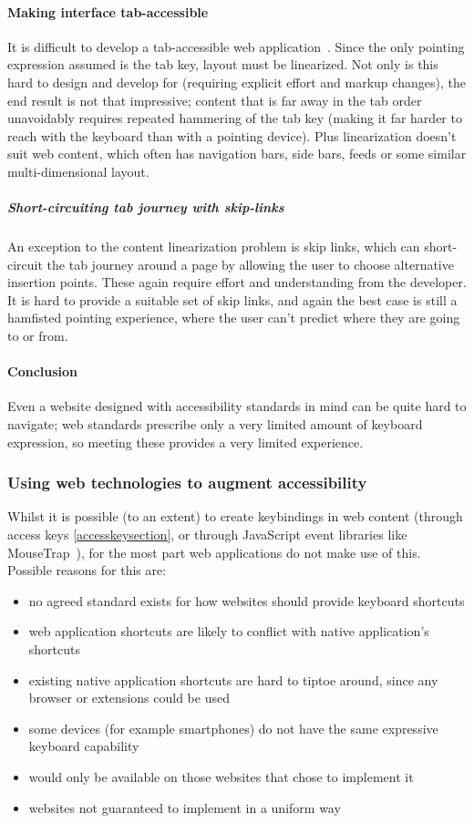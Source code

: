 \documentclass[a4paper, 11pt]{article}
\begin{document}
\paragraph{Making interface tab-accessible}
   It is difficult to develop a tab-accessible web application~\cite{watanabe2012using}. Since the only pointing expression assumed is the tab key, layout must be linearized. Not only is this hard to design and develop for (requiring explicit effort and markup changes), the end result is not that impressive; content that is far away in the tab order unavoidably requires repeated hammering of the tab key (making it far harder to reach with the keyboard than with a pointing device). Plus linearization doesn't suit web content, which often has navigation bars, side bars, feeds or some similar multi-dimensional layout.
\subparagraph{Short-circuiting tab journey with skip-links}
  An exception to the content linearization problem is skip links, which can short-circuit the tab journey around a page by allowing the user to choose alternative insertion points. These again require effort and understanding from the developer. It is hard to provide a suitable set of skip links, and again the best case is still a hamfisted pointing experience, where the user can't predict where they are going to or from.
\paragraph{Conclusion}
  Even a website designed with accessibility standards in mind can be quite hard to navigate; web standards prescribe only a very limited amount of keyboard expression, so meeting these provides a very limited experience.

\subsubsection{Using web technologies to augment accessibility}
  Whilst it is possible (to an extent) to create \glspl{keybinding} in web content (through access keys \cref{accesskeysection}, or through JavaScript event libraries like MouseTrap~\cite{Mousetrap}), for the most part web applications do not make use of this. Possible reasons for this are:

\begin{itemize}
 \item no agreed standard exists for how websites should provide keyboard shortcuts
 \item web application shortcuts are likely to conflict with native application's shortcuts
 \item existing native application shortcuts are hard to tiptoe around, since any browser or extensions could be used
 \item some devices (for example smartphones) do not have the same expressive keyboard capability
 \item would only be available on those websites that chose to implement it
 \item websites not guaranteed to implement in a uniform way
\end{itemize}
\end{document}
